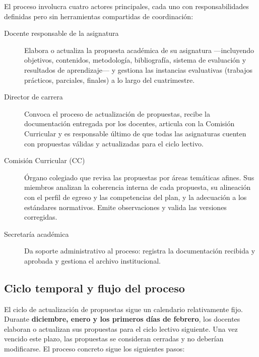 El proceso involucra cuatro actores principales, cada uno con responsabilidades definidas pero sin herramientas compartidas de coordinación:

\begin{description}
    \item[Docente responsable de la asignatura] Elabora o actualiza la propuesta académica de su asignatura ---incluyendo objetivos, contenidos, metodología, bibliografía, sistema de evaluación y resultados de aprendizaje--- y gestiona las instancias evaluativas (trabajos prácticos, parciales, finales) a lo largo del cuatrimestre.

    \item[Director de carrera] Convoca el proceso de actualización de propuestas, recibe la documentación entregada por los docentes, articula con la Comisión Curricular y es responsable último de que todas las asignaturas cuenten con propuestas válidas y actualizadas para el ciclo lectivo.

    \item[Comisión Curricular (CC)] Órgano colegiado que revisa las propuestas por áreas temáticas afines. Sus miembros analizan la coherencia interna de cada propuesta, su alineación con el perfil de egreso y las competencias del plan, y la adecuación a los estándares normativos. Emite observaciones y valida las versiones corregidas.

    \item[Secretaría académica] Da soporte administrativo al proceso: registra la documentación recibida y aprobada y gestiona el archivo institucional.
\end{description}

\subsection{Ciclo temporal y flujo del proceso}
\label{subsec:ciclo_asis}

El ciclo de actualización de propuestas sigue un calendario relativamente fijo. Durante \textbf{diciembre, enero y los primeros días de febrero}, los docentes elaboran o actualizan sus propuestas para el ciclo lectivo siguiente. Una vez vencido este plazo, las propuestas se consideran cerradas y no deberían modificarse. El proceso concreto sigue los siguientes pasos:

